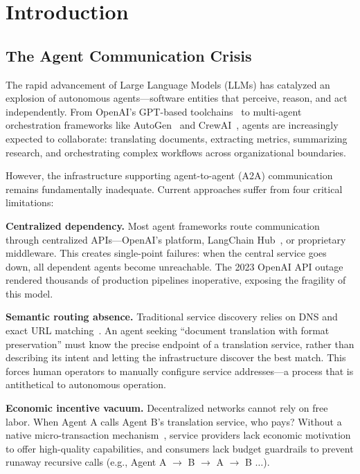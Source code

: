 \section{Introduction}

\subsection{The Agent Communication Crisis}

The rapid advancement of Large Language Models (LLMs) has catalyzed an explosion of autonomous agents---software entities that perceive, reason, and act independently. From OpenAI's GPT-based toolchains~\cite{openai2024swarm} to multi-agent orchestration frameworks like AutoGen~\cite{wu2023autogen} and CrewAI~\cite{crewai2024}, agents are increasingly expected to collaborate: translating documents, extracting metrics, summarizing research, and orchestrating complex workflows across organizational boundaries.

However, the infrastructure supporting agent-to-agent (A2A) communication remains fundamentally inadequate. Current approaches suffer from four critical limitations:

\textbf{Centralized dependency.} Most agent frameworks route communication through centralized APIs---OpenAI's platform, LangChain Hub~\cite{chase2022langchain}, or proprietary middleware. This creates single-point failures: when the central service goes down, all dependent agents become unreachable. The 2023 OpenAI API outage rendered thousands of production pipelines inoperative, exposing the fragility of this model.

\textbf{Semantic routing absence.} Traditional service discovery relies on DNS and exact URL matching~\cite{consul2015,etcd2016}. An agent seeking ``document translation with format preservation'' must know the precise endpoint of a translation service, rather than describing its intent and letting the infrastructure discover the best match. This forces human operators to manually configure service addresses---a process that is antithetical to autonomous operation.

\textbf{Economic incentive vacuum.} Decentralized networks cannot rely on free labor. When Agent A calls Agent B's translation service, who pays? Without a native micro-transaction mechanism~\cite{nakamoto2008bitcoin}, service providers lack economic motivation to offer high-quality capabilities, and consumers lack budget guardrails to prevent runaway recursive calls (e.g., Agent A $\rightarrow$ B $\rightarrow$ A $\rightarrow$ B $\ldots$).

